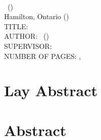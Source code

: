 \documentclass[
11pt, %
oneside, %
english, %
singlespacing, %
]{macthesis} %
\def\blankpage{%
      \clearpage%
      \thispagestyle{empty}%
      \addtocounter{page}{-1}%
      \null%
      \clearpage}
\begin{document}


\blankpage
\clearpage


\newpage
{} %
\setcounter{page}{2} %

\noindent %
\univname \\
\degreename\, (\the\year) \\
Hamilton, Ontario (\deptname) \\[1.5cm]
TITLE: \ttitle \\
AUTHOR: \authorname\,  %
(\univname)  \\
SUPERVISOR: \supname\, \\
NUMBER OF PAGES: \pageref{lastoffront}, \pageref{LastPage}  %

\clearpage

\section*{Lay Abstract}
\blankpage
\clearpage



\section*{\Huge Abstract}
\addchaptertocentry{\abstractname}

\blankpage
\clearpage

\end{document}
